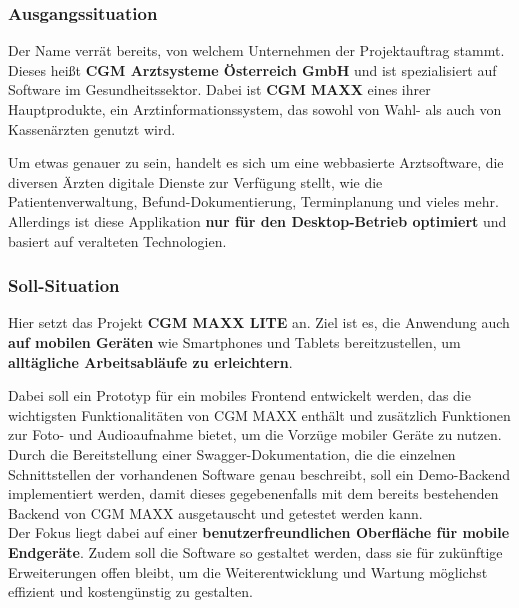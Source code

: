 
\subsubsection{Ausgangssituation}

Der Name verrät bereits, von welchem Unternehmen der Projektauftrag stammt. Dieses heißt \textbf{CGM Arztsysteme Österreich GmbH} und ist spezialisiert auf Software im Gesundheitssektor. Dabei ist \textbf{CGM MAXX} eines ihrer Hauptprodukte, ein Arztinformationssystem, das sowohl von Wahl- als auch von Kassenärzten genutzt wird.

Um etwas genauer zu sein, handelt es sich um eine webbasierte Arztsoftware, die diversen Ärzten digitale Dienste zur Verfügung stellt, wie die Patientenverwaltung, Befund-Dokumentierung, Terminplanung und vieles mehr.
Allerdings ist diese Applikation \textbf{nur für den Desktop-Betrieb optimiert} und basiert auf veralteten Technologien.
\cite{EA:Web10}



\subsubsection{Soll-Situation}

Hier setzt das Projekt \textbf{CGM MAXX LITE} an. Ziel ist es, die Anwendung auch \textbf{auf mobilen Geräten} wie Smartphones und Tablets bereitzustellen, um \textbf{alltägliche Arbeitsabläufe zu erleichtern}.

Dabei soll ein Prototyp für ein mobiles Frontend entwickelt werden, das die wichtigsten Funktionalitäten von CGM MAXX enthält und zusätzlich Funktionen zur Foto- und Audioaufnahme bietet, um die Vorzüge mobiler Geräte zu nutzen.
Durch die Bereitstellung einer Swagger-Dokumentation, die die einzelnen Schnittstellen der vorhandenen Software genau beschreibt, soll ein Demo-Backend implementiert werden, damit dieses gegebenenfalls mit dem bereits bestehenden Backend von CGM MAXX ausgetauscht und getestet werden kann. \\
Der Fokus liegt dabei auf einer \textbf{benutzerfreundlichen Oberfläche für mobile Endgeräte}. Zudem soll die Software so gestaltet werden, dass sie für zukünftige Erweiterungen offen bleibt, um die Weiterentwicklung und Wartung möglichst effizient und kostengünstig zu gestalten.



